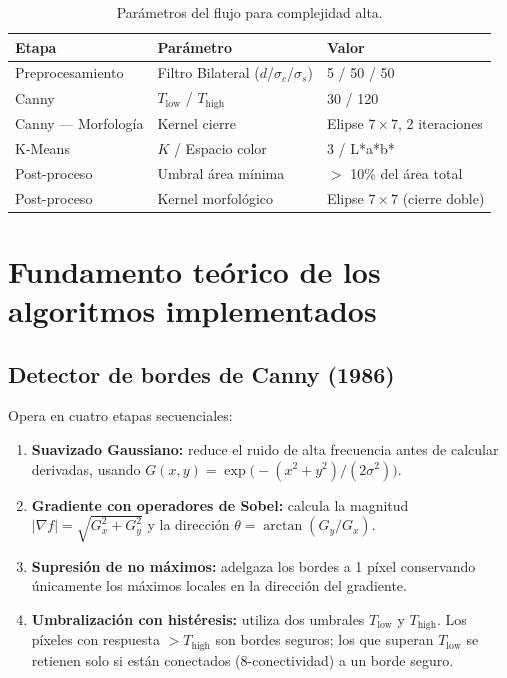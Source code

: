 \documentclass[11pt,a4paper]{article}
\begin{document}
\begin{table}[H]
    \centering
    \renewcommand{\arraystretch}{1.3}
    \begin{tabular}{@{}lll@{}}
        \toprule
        \textbf{Etapa} & \textbf{Parámetro} & \textbf{Valor} \\ \midrule
        Preprocesamiento & Filtro Bilateral ($d$/$\sigma_c$/$\sigma_s$) & 5 / 50 / 50 \\
        Canny & $T_{\text{low}}$ / $T_{\text{high}}$ & 30 / 120 \\
        Canny — Morfología & Kernel cierre & Elipse $7\times7$, 2 iteraciones \\
        K-Means & $K$ / Espacio color & 3 / L*a*b* \\
        Post-proceso & Umbral área mínima & $>$ 10\% del área total \\
        Post-proceso & Kernel morfológico & Elipse $7\times7$ (cierre doble) \\
        \bottomrule
    \end{tabular}
    \caption{Parámetros del flujo para complejidad alta.}
    \label{tab:params_alta}
\end{table}

\section{Fundamento teórico de los algoritmos implementados}

\subsection{Detector de bordes de Canny (1986)}

Opera en cuatro etapas secuenciales:

\begin{enumerate}
    \item \textbf{Suavizado Gaussiano:} reduce el ruido de alta frecuencia antes
    de calcular derivadas, usando $G(x,y) = \exp\!\bigl(-(x^2+y^2)/(2\sigma^2)\bigr)$.

    \item \textbf{Gradiente con operadores de Sobel:} calcula la magnitud
    $|\nabla f| = \sqrt{G_x^2 + G_y^2}$ y la dirección $\theta = \arctan(G_y/G_x)$.

    \item \textbf{Supresión de no máximos:} adelgaza los bordes a 1 píxel
    conservando únicamente los máximos locales en la dirección del gradiente.

    \item \textbf{Umbralización con histéresis:} utiliza dos umbrales $T_{\text{low}}$
    y $T_{\text{high}}$. Los píxeles con respuesta $> T_{\text{high}}$ son bordes
    seguros; los que superan $T_{\text{low}}$ se retienen solo si están conectados
    (8-conectividad) a un borde seguro.
\end{enumerate}
\end{document}
